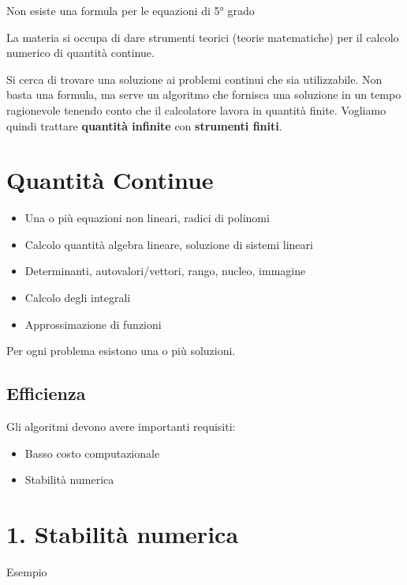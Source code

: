 \documentclass[
]{article}
\providecommand{\tightlist}{%
  \setlength{\itemsep}{0pt}\setlength{\parskip}{0pt}}
\begin{document}
Non esiste una formula per le equazioni di 5° grado

La materia si occupa di dare strumenti teorici (teorie matematiche) per
il calcolo numerico di quantità continue.

Si cerca di trovare una soluzione ai problemi continui che sia
utilizzabile. Non basta una formula, ma serve un algoritmo che fornisca
una soluzione in un tempo ragionevole tenendo conto che il calcolatore
lavora in quantità finite. Vogliamo quindi trattare \textbf{quantità
infinite} con \textbf{strumenti finiti}.

\hypertarget{quantituxe0-continue}{%
\section{Quantità Continue}\label{quantituxe0-continue}}

\begin{itemize}
\tightlist
\item
  Una o più equazioni non lineari, radici di polinomi
\item
  Calcolo quantità algebra lineare, soluzione di sistemi lineari
\item
  Determinanti, autovalori/vettori, rango, nucleo, immagine
\item
  Calcolo degli integrali
\item
  Approssimazione di funzioni
\end{itemize}

Per ogni problema esistono una o più soluzioni.

\hypertarget{efficienza}{%
\subsection{Efficienza}\label{efficienza}}

Gli algoritmi devono avere importanti requisiti:

\begin{itemize}
\tightlist
\item
  Basso costo computazionale
\item
  Stabilità numerica
\end{itemize}

\hypertarget{stabilituxe0-numerica}{%
\section{1. Stabilità numerica}\label{stabilituxe0-numerica}}

Esempio
\end{document}
